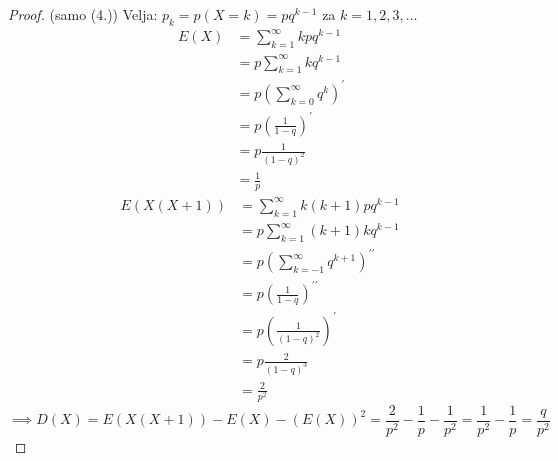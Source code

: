 \documentclass[12pt]{book}
\def\s{\vspace{10pt}}
\theoremstyle{definition}
\theoremstyle{plain}
\theoremstyle{plain}
\theoremstyle{plain}
\theoremstyle{remark}
\begin{document}
\begin{proof}(samo (4.))
    Velja: $p_k=p(X=k)=p q^{k-1}$ za $k=1, 2, 3, \ldots$
    $$
    \begin{aligned}
        \ E(X)&=\sum_{k=1}^{\infty} k p  q^{k-1} \\
        &=p \sum_{k=1}^{\infty} k q^{k-1} \\
        &=p \left(\sum_{k=0}^{\infty} q^k\right)^{\prime} \\
        &=p \left(\frac{1}{1-q}\right)^{\prime} \\
        &=p \frac{1}{(1-q)^2} \\
        &=\frac{1}{p}
    \end{aligned}
    $$
    \s
    $$
    \begin{aligned}
        E(X(X+1))&=\sum_{k=1}^{\infty} k(k+1) p q^{k-1} \\
        &=p \sum_{k=1}^{\infty}(k+1) k q^{k-1} \\
        &=p\left(\sum_{k=-1}^{\infty} q^{k+1}\right)^{\prime \prime} \\
        &=p \left(\frac{1}{1-q}\right)^{\prime \prime} \\
        &=p \left(\frac{1}{(1-q)^2}\right)^{\prime} \\
        &= p  \frac{2}{(1-q)^3} \\
        &= \frac{2}{p^2}
    \end{aligned}
    $$
    $$
    \implies D(X)=E(X(X+1))-E(X)-(E(X))^2 = \frac{2}{p^2}-\frac{1}{p}-\frac{1}{p^2}=\frac{1}{p^2}-\frac{1}{p}=\frac{q}{p^2}
    $$
\end{proof}
\end{document}
